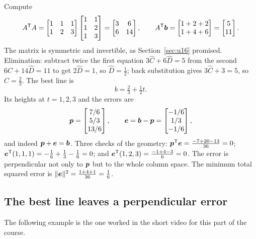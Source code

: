 \begin{example}\label{ex:u18-lecture}
Compute
\[
  A^{\mathsf{T}} A=\begin{bmatrix}1&1&1\\1&2&3\end{bmatrix}\begin{bmatrix}1&1\\1&2\\1&3\end{bmatrix}
  =\begin{bmatrix}3&6\\6&14\end{bmatrix},\qquad
  A^{\mathsf{T}}\boldsymbol{b}=\begin{bmatrix}1+2+2\\1+4+6\end{bmatrix}=\begin{bmatrix}5\\11\end{bmatrix}.
\]
The matrix is symmetric and invertible, as Section~\ref{sec:u16} promised. Elimination:
subtract twice the first equation $3\hat C+6\hat D=5$ from the second $6\hat C+14\hat D=11$ to
get $2\hat D=1$, so $\hat D=\tfrac12$; back substitution gives $3\hat C+3=5$, so
$\hat C=\tfrac23$. The best line is
\[
  b=\tfrac23+\tfrac12 t .
\]
Its heights at $t=1,2,3$ and the errors are
\[
  \boldsymbol{p}=\begin{bmatrix}7/6\\5/3\\13/6\end{bmatrix},\qquad
  \boldsymbol{e}=\boldsymbol{b}-\boldsymbol{p}=\begin{bmatrix}-1/6\\1/3\\-1/6\end{bmatrix},
\]
and indeed $\boldsymbol{p}+\boldsymbol{e}=\boldsymbol{b}$. Three checks of the geometry:
$\boldsymbol{p}^{\mathsf{T}}\boldsymbol{e}=\frac{-7+20-13}{36}=0$;
$\boldsymbol{e}^{\mathsf{T}}(1,1,1)=-\frac16+\frac13-\frac16=0$; and
$\boldsymbol{e}^{\mathsf{T}}(1,2,3)=\frac{-1+4-3}{6}=0$. The error is perpendicular not only to $\boldsymbol{p}$ but to
the whole column space. The minimum total squared error is
$\|\boldsymbol{e}\|^2=\frac{1+4+1}{36}=\frac16$.
\end{example}

\subsection{The best line leaves a perpendicular error}

The following example is the one worked in the short video for this part of the course.

